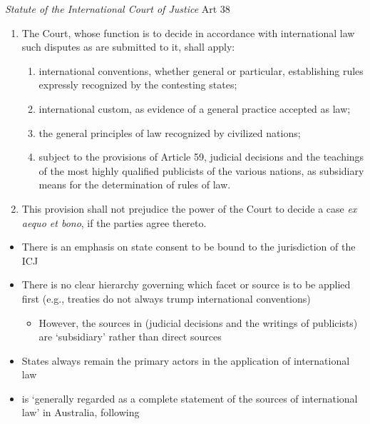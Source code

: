 \begin{statutedetails}{\textit{Statute of the International Court of Justice} Art 38}\label{ICJ Statute Art 38}
    \flushleft
    \begin{enumerate}
        \item The Court, whose function is to decide in accordance with international law such disputes as are submitted to it, shall apply:
        \begin{enumerate}[label=\alph*.]
            \item international conventions, whether general or particular, establishing rules expressly recognized by the contesting states;
            \item international custom, as evidence of a general practice accepted as law;
            \item the general principles of law recognized by civilized nations;
            \item subject to the provisions of Article 59, judicial decisions and the teachings of the most highly qualified publicists of the various nations, as subsidiary means for the determination of rules of law.
        \end{enumerate}
        \item This provision shall not prejudice the power of the Court to decide a case \textit{ex aequo et bono}, if the parties agree thereto.
    \end{enumerate}
\end{statutedetails}

\begin{itemize}
    \item There is an emphasis on state consent to be bound to the jurisdiction of the ICJ
    \item There is no clear hierarchy governing which facet or source is to be applied first (e.g., treaties do not always trump international conventions)
    \begin{itemize}
        \item However, the sources in  (judicial decisions and the writings of publicists) are `subsidiary' rather than direct sources
    \end{itemize}
    \item States always remain the primary actors in the application of international law
    \item {} is `generally regarded as a complete statement of the sources of international law' in Australia, following 
\end{itemize}

